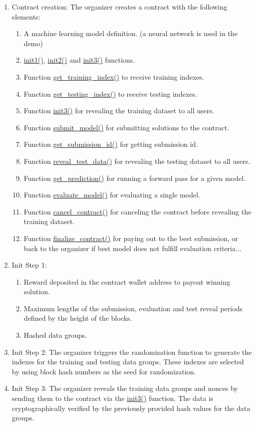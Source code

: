 \documentclass{article}
\begin{document}
\begin{enumerate}
\item Contract creation: The organizer creates a contract with the following elements:
    \begin{enumerate}
    \item A machine learning model definition. (a neural network is used in the demo)
    \item \underline{init1()}, \underline{init2()} and \underline{init3()} functions.
    \item Function \underline{get\_training\_index()} to receive training indexes.
    \item Function \underline{get\_testing\_index()} to receive testing indexes.
    \item Function \underline{init3()} for revealing the training dataset to all users.
    \item Function \underline{submit\_model()} for submitting solutions to the contract.
    \item Function \underline{get\_submission\_id()} for getting submission id.
    \item Function \underline{reveal\_test\_data()} for revealing the testing dataset to all users.
    \item Function \underline{get\_prediction()} for running a forward pass for a given model.
    \item Function \underline{evaluate\_model()} for evaluating a single model.
    \item Function \underline{cancel\_contract()} for canceling the contract before revealing the training dataset.
    \item Function \underline{finalize\_contract()} for paying out to the best submission, or back to the organizer if best model does not fulfill evaluation criteria...
    \end{enumerate}
\item Init Step 1:
    \begin{enumerate}
    \item Reward deposited in the contract wallet address to payout winning solution.
    \item Maximum lengths of the submission, evaluation and test reveal periods defined by the height of the blocks.
    \item Hashed data groups.
    \end{enumerate}
\item Init Step 2: The organizer triggers the randomization function to generate the indexes for the training and testing data groups. These indexes are selected by using block hash numbers as the seed for randomization.
\item Init Step 3: The organizer reveals the training data groups and nonces by sending them to the contract via the \underline{init3()} function. The data is cryptographically verified by the previously provided hash values for the data groups.
\end{enumerate}
\end{document}
